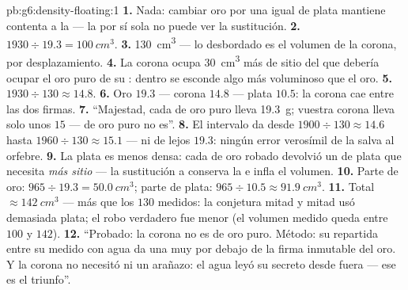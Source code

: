 \begin{solution}{pb:g6:density-floating:1}
\textbf{1.} Nada: cambiar oro por una \emph{} igual de plata
mantiene contenta a la  --- la  por sí sola no puede ver
la sustitución.
\textbf{2.} $1930 \div 19.3 = \qty{100}{cm^3}$.
\textbf{3.} \qty{130}{cm^3} --- lo desbordado es el volumen de la
corona, por desplazamiento.
\textbf{4.} La corona ocupa \qty{30}{cm^3} más de sitio del que
debería ocupar el oro puro de su : dentro se esconde algo más
voluminoso que el oro.
\textbf{5.} $1930 \div 130 \approx 14.8$.
\textbf{6.} Oro $19.3$ --- corona $14.8$ --- plata $10.5$: la corona
cae entre las dos firmas.
\textbf{7.} ``Majestad, cada  de oro puro lleva
\qty{19.3}{g}; vuestra corona lleva solo unos $15$ --- de oro puro no
es''.
\textbf{8.} El intervalo da  desde
$1900 \div 130 \approx 14.6$ hasta $1960 \div 130 \approx 15.1$ ---
ni de lejos $19.3$: ningún error verosímil de la  salva al
orfebre.
\textbf{9.} La plata es menos densa: cada  de oro robado
devolvió un  de plata que necesita \emph{más sitio} --- la
sustitución  a  conserva la  e infla el volumen.
\textbf{10.} Parte de oro: $965 \div 19.3 = \qty{50.0}{cm^3}$; parte
de plata: $965 \div 10.5 \approx \qty{91.9}{cm^3}$.
\textbf{11.} Total $\approx \qty{142}{cm^3}$ --- más que los $130$
medidos: la conjetura mitad y mitad usó demasiada plata; el robo
verdadero fue menor (el volumen medido queda entre $100$ y $142$).
\textbf{12.} ``Probado: la corona no es de oro puro. Método: su
 repartida entre su  medido con agua da una
 muy por debajo de la firma inmutable del oro. Y la corona
no necesitó ni un arañazo: el agua leyó su secreto desde fuera --- ese
es el triunfo''.
\end{solution}
